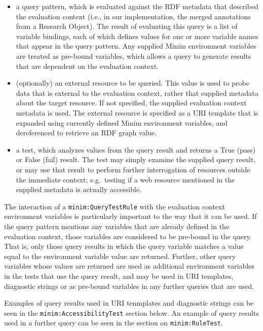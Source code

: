 \documentclass[]{article}
\begin{document}
\begin{itemize}
\itemsep1pt\parskip0pt
\item
  a query pattern, which is evaluated against the RDF metadata that
  described the evaluation context (i.e., in our implementation, the
  merged annotations from a Research Object). The result of evaluating
  this query is a list of variable bindings, each of which defines
  values for one or more variable names that appear in the query
  pattern. Any supplied Minim environment variables are treated as
  pre-bound variables, which allows a query to generate results that are
  dependent on the evaluation context.
\item
  (optionally) an external resource to be queried. This value is used to
  probe data that is external to the evaluation context, rather that
  supplied metadata about the target resource. If not specified, the
  supplied evaluation context metadata is used. The external resource is
  specified as a URI template that is expanded using currently defined
  Minim environment variables, and dereferenced to retrieve an RDF graph
  value.
\item
  a test, which analyzes values from the query result and returns a True
  (pass) or False (fail) result. The test may simply examine the
  supplied query result, or may use that result to perform further
  interrogation of resources outside the immediate context; e.g.~testing
  if a web resource mentioned in the supplied metadata is actually
  accessible.
\end{itemize}

The interaction of a \texttt{minim:QueryTestRule} with the evaluation
context environment variables is particularly important to the way that
it can be used. If the query pattern mentions any variables that are
already defined in the evaluation context, those variables are
considered to be pre-bound in the query. That is, only those query
results in which the query variable matches a value equal to the
environment variable value are returned. Further, other query variables
whose values are returned are used as additional environment variables
in the tests that use the query result, and may be used in URI
templates, diagnostic strings or as pre-bound variables in any further
queries that are used.

Examples of query results used in URI tenmplates and diagnostic strings
can be seen in the \texttt{minim:AccessibilityTest} section below. An
example of query results used in a further query can be seen in the
section on \texttt{minim:RuleTest}.
\end{document}
